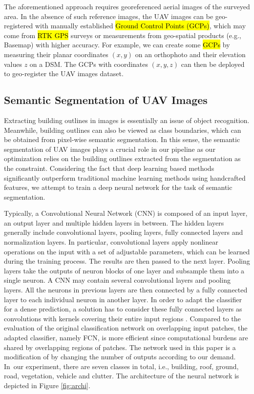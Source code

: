 \documentclass[remotesensing,article,accept,moreauthors,pdftex,10pt,a4paper]{mdpi}
\theoremstyle{mdpi}
\newcounter{ex}
\newcounter{re}
\begin{document}
The aforementioned approach requires georeferenced aerial images of the surveyed area. In the absence of such reference images, the UAV images can be geo-registered with manually established \hl{Ground Control Points (GCPs)}, %
which may come from \hl{RTK GPS} surveys 
or measurements from geo-spatial products (e.g., Basemap) with higher accuracy. For example, we can create some \hl{GCPs} %
by measuring their planar coordinates $(x,y)$ on an orthophoto and their elevation values $z$ on a DSM. The GCPs with coordinates $(x,y,z)$ can then be deployed to geo-register the UAV images dataset. 

\subsection{Semantic Segmentation of UAV Images}
Extracting building outlines in images is essentially an issue of object recognition. Meanwhile, building outlines can also be viewed as class boundaries, which can be obtained from pixel-wise semantic segmentation. In this sense, the semantic segmentation of UAV images plays a crucial role in our pipeline as our optimization relies on the building outlines extracted from the segmentation as the constraint. Considering the fact that deep learning based methods significantly outperform traditional machine learning methods using handcrafted features, we attempt to train a deep neural network for the task of semantic segmentation.

Typically, a Convolutional Neural Network (CNN) is composed of an input layer, an output layer and multiple hidden layers in between. The hidden layers generally include convolutional layers, pooling layers, fully connected layers and normalization layers. In particular, convolutional layers apply nonlinear operations on the input with a set of adjustable parameters, which can be learned during the training process. The results are then passed to the next layer. Pooling layers take the outputs of neuron blocks of one layer and subsample them into a single neuron. A CNN may contain several convolutional layers and pooling layers. All the neurons in previous layers are then connected by a fully connected layer to each individual neuron in another layer. In order to adapt the classifier for a dense prediction, a solution has to consider these fully connected layers as convolutions with kernels covering their entire input regions \cite{fcn}. Compared to the evaluation of the original classification network on overlapping input patches, the adapted classifier, namely FCN, is more efficient since computational burdens are shared by overlapping regions of patches. The network used in this paper is a modification of \cite{fcn} by changing the number of outputs according to our demand. In~our experiment, there are seven classes in total, i.e., building, roof, ground, road, vegetation, vehicle and clutter. The architecture of the neural network is depicted in Figure \ref{fig:archi}.
\end{document}
